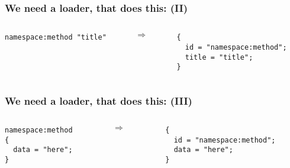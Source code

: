 \documentclass[handout]{beamer}
\begin{document}
\begin{frame}[fragile]

\frametitle{We need a loader, that does this: (II)}

\begin{columns}

\begin{column}{0.5\textwidth}
\begin{verbatim}
namespace:method "title"
\end{verbatim}
\end{column}

\begin{column}{0.05\textwidth}
$\Rightarrow$
\end{column}

\begin{column}{0.5\textwidth}
\begin{verbatim}
{
  id = "namespace:method";
  title = "title";
}
\end{verbatim}
\end{column}

\end{columns}

\end{frame}


\begin{frame}[fragile]

\frametitle{We need a loader, that does this: (III)}

\begin{columns}

\begin{column}{0.5\textwidth}
\begin{verbatim}
namespace:method
{
  data = "here";
}
\end{verbatim}
\end{column}

\begin{column}{0.05\textwidth}
$\Rightarrow$
\end{column}

\begin{column}{0.5\textwidth}
\begin{verbatim}
{
  id = "namespace:method";
  data = "here";
}
\end{verbatim}
\end{column}

\end{columns}

\end{frame}
\end{document}
